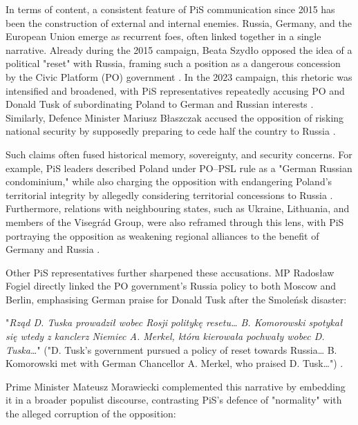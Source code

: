 In terms of content, a consistent feature of PiS communication since 2015 has been the construction of external and internal enemies. Russia, Germany, and the European Union emerge as recurrent foes, often linked together in a single narrative. Already during the 2015 campaign, Beata Szydło opposed the idea of a political "reset" with Russia, framing such a position as a dangerous concession by the Civic Platform (PO) government \citep{pisorgpl2015a}. In the 2023 campaign, this rhetoric was intensified and broadened, with PiS representatives repeatedly accusing PO and Donald Tusk of subordinating Poland to German and Russian interests \citep{pisorgpl2023a}. Similarly, Defence Minister Mariusz Błaszczak accused the opposition of risking national security by supposedly preparing to cede half the country to Russia \citep{pisorgpl2023b}.

Such claims often fused historical memory, sovereignty, and security concerns. For example, PiS leaders described Poland under PO–PSL rule as a "German Russian condominium," while also charging the opposition with endangering Poland's territorial integrity by allegedly considering territorial concessions to Russia \citep{pisorgpl2023c}. Furthermore, relations with neighbouring states, such as Ukraine, Lithuania, and members of the Visegrád Group, were also reframed through this lens, with PiS portraying the opposition as weakening regional alliances to the benefit of Germany and Russia \citep{pisorgpl2023d}.

Other PiS representatives further sharpened these accusations. MP Radosław Fogiel directly linked the PO government’s Russia policy to both Moscow and Berlin, emphasising German praise for Donald Tusk after the Smoleńsk disaster: 

\begin{displayquote}
    "\textit{Rząd D. Tuska prowadził wobec Rosji politykę resetu… B. Komorowski spotykał się wtedy z kanclerz Niemiec A. Merkel, która kierowała pochwały wobec D. Tuska…}" ("D. Tusk's government pursued a policy of reset towards Russia… B. Komorowski met with German Chancellor A. Merkel, who praised D. Tusk…") \citep{pisorgpl2023c}.
\end{displayquote}

\pagebreak

Prime Minister Mateusz Morawiecki complemented this narrative by embedding it in a broader populist discourse, contrasting PiS’s defence of "normality" with the alleged corruption of the opposition: 

